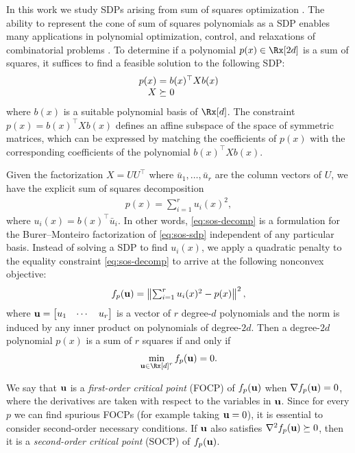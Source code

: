 \documentclass[final,onefignum,onetabnum]{siamart220329}
\begin{document}
In this work we study SDPs arising from sum of squares optimization
\cite{ParriloStructuredsemidefiniteprograms2000}. The ability to represent the
cone of sum of squares polynomials as a SDP enables many applications in
polynomial optimization, control, and relaxations of combinatorial problems
\cite{laurent2009sums, blekherman_semidefinite_2013}. To determine if a
polynomial $p(x) \in \Rx[2d]$ is a sum of squares, it suffices to find a
feasible solution to the following SDP:
\begin{align} \label{eq:sos-sdp}
  \arraycolsep=1.5pt
  \begin{array}{rcl}
    p(x) &=& b(x)^\top X b(x) \\
    X &\succeq& 0
  \end{array}
\end{align}
where $b(x)$ is a suitable polynomial basis of $\Rx[d]$. The constraint
$p(x) = b(x)^\top X b(x)$ defines an affine subspace of the space of symmetric
matrices, which can be expressed by matching the coefficients of $p(x)$ with the
corresponding coefficients of the polynomial $b(x)^\top X b(x)$.

Given the factorization $X = UU^\top$ where $\bar{u}_1, \ldots, \bar{u}_r$ are
the column vectors of $U$, we have the explicit sum of squares decomposition
\begin{align} \label{eq:sos-decomp}
  \textstyle
  p(x) = \sum_{i=1}^r u_i(x)^2,
\end{align}
where $u_i(x) = b(x)^\top \bar{u}_i$. In other words, \eqref{eq:sos-decomp} is a
formulation for the Burer--Monteiro factorization of \eqref{eq:sos-sdp}
independent of any particular basis. Instead of solving a SDP to find $u_i(x)$,
we apply a quadratic penalty to the equality constraint \eqref{eq:sos-decomp} to
arrive at the following nonconvex objective:
\begin{align} \label{eq:nonconvex-obj}
  f_p(\boldsymbol{\mathbf{u}}) = \left\lVert \textstyle \sum_{i=1}^r u_i(x)^2 -  p(x) \right\lVert^2,
\end{align}
where $\boldsymbol{\mathbf{u}} = \begin{bmatrix}u_1 & \cdots & u_r\end{bmatrix}$ is a vector of $r$ degree-$d$
polynomials and the norm is induced by any inner product on polynomials of
degree-$2d$. Then a degree-$2d$ polynomial $p(x)$ is a sum of $r$ squares if and
only if
\begin{align*}
  \min_{\vecp{u} \in \Rx[d]^r} f_p(\vecp{u}) = 0.
\end{align*}

We say that $\boldsymbol{\mathbf{u}}$ is a \emph{first-order critical point} (FOCP) of
$f_p(\boldsymbol{\mathbf{u}})$ when $\nabla f_p(\boldsymbol{\mathbf{u}}) = 0$, where the derivatives are taken
with respect to the variables in $\boldsymbol{\mathbf{u}}$. Since for every $p$ we can find
spurious FOCPs (for example taking $\boldsymbol{\mathbf{u}} = 0$), it is essential to consider
second-order necessary conditions. If $\boldsymbol{\mathbf{u}}$ also satisfies
$\nabla^2 f_p(\boldsymbol{\mathbf{u}}) \succeq 0$, then it is a \emph{second-order critical
  point} (SOCP) of $f_p(\boldsymbol{\mathbf{u}})$.
\end{document}

